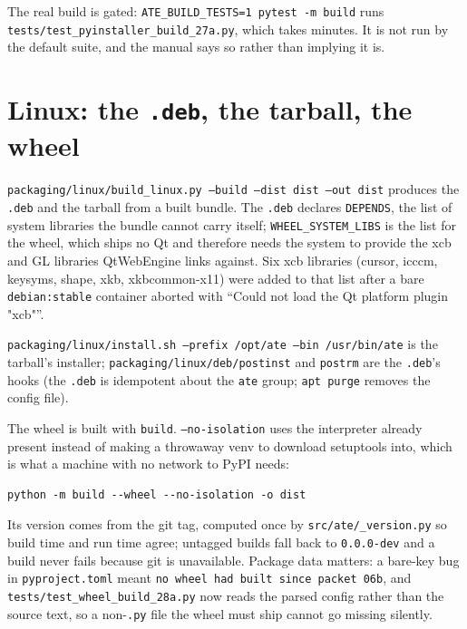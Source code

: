 The real build is gated: \texttt{ATE\_\allowbreak{}BUILD\_\allowbreak{}TESTS=1 pytest -m build} runs
\texttt{tests/\allowbreak{}test\_\allowbreak{}pyinstaller\_\allowbreak{}build\_\allowbreak27a.py}, which takes minutes. It is not run by the default suite,
and the manual says so rather than implying it is.

\section{Linux: the \texttt{.deb}, the tarball, the wheel}

\texttt{packaging/\allowbreak{}linux/\allowbreak{}build\_\allowbreak{}linux.py --build --dist dist --out dist} produces the \texttt{.deb} and the
tarball from a built bundle. The \texttt{.deb} declares \texttt{DEPENDS}, the list of system libraries the
bundle cannot carry itself; \texttt{WHEEL\_SYSTEM\_LIBS} is the list for the wheel, which ships no Qt and
therefore needs the system to provide the xcb and GL libraries QtWebEngine links against. Six xcb
libraries (cursor, icccm, keysyms, shape, xkb, xkbcommon-x11) were added to that list after a bare
\texttt{debian:stable} container aborted with ``Could not load the Qt platform plugin "xcb"''.

\texttt{packaging/\allowbreak{}linux/\allowbreak{}install.sh --prefix /\allowbreak{}opt/\allowbreak{}ate --bin /\allowbreak{}usr/\allowbreak{}bin/\allowbreak{}ate} is the tarball's installer;
\texttt{packaging/\allowbreak{}linux/\allowbreak{}deb/\allowbreak{}postinst} and \texttt{postrm} are the \texttt{.deb}'s hooks (the \texttt{.deb}
is idempotent about the \texttt{ate} group; \texttt{apt purge} removes the config file).

The wheel is built with \texttt{build}. \texttt{--no-isolation} uses the interpreter already present
instead of making a throwaway venv to download setuptools into, which is what a machine with no
network to PyPI needs:

\begin{lstlisting}[language=ATEShell]
python -m build --wheel --no-isolation -o dist
\end{lstlisting}

Its version comes from the git tag, computed once by \texttt{src/ate/\_version.py} so build time and run
time agree; untagged builds fall back to \texttt{0.0.0-dev} and a build never fails because git is
unavailable. Package data matters: a bare-key bug in \texttt{pyproject.toml} meant \texttt{no wheel had
built since packet 06b}, and \texttt{tests/\allowbreak{}test\_\allowbreak{}wheel\_\allowbreak{}build\_\allowbreak28a.py} now reads the parsed config rather
than the source text, so a non-\texttt{.py} file the wheel must ship cannot go missing silently.

